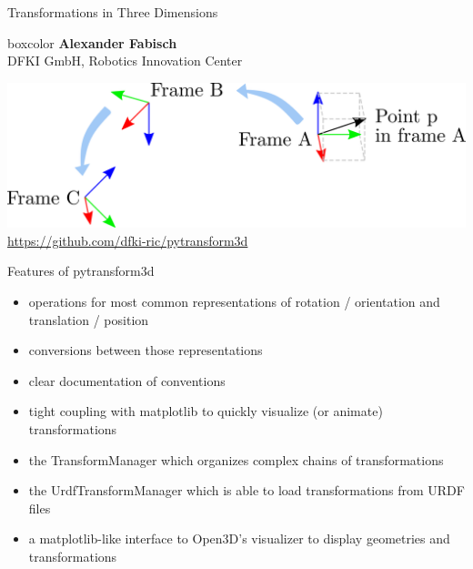 \documentclass[14pt]{beamer}
\begin{document}
\begin{frame}
\begin{center}
{Transformations in Three Dimensions\par}
\vfill

\begin{beamercolorbox}[sep=0.5em,center]{boxcolor}
\textbf{Alexander Fabisch}\\
DFKI GmbH, Robotics Innovation Center
\end{beamercolorbox}

\vfill
\includegraphics[width=\textwidth]{images/transformation_modeling}
\vfill
\url{https://github.com/dfki-ric/pytransform3d}
\end{center}
\end{frame}

\begin{frame}{Features of pytransform3d}
\begin{itemize}
\item operations for most common representations of rotation / orientation and
  translation / position
\item conversions between those representations
\item clear documentation of conventions
\item tight coupling with matplotlib to quickly visualize (or animate)
  transformations
\item the TransformManager which organizes complex chains of transformations
\item the UrdfTransformManager which is able to load transformations from URDF
  files
\item a matplotlib-like interface to Open3D’s visualizer to display geometries and
  transformations
\end{itemize}
\end{frame}
\end{document}
